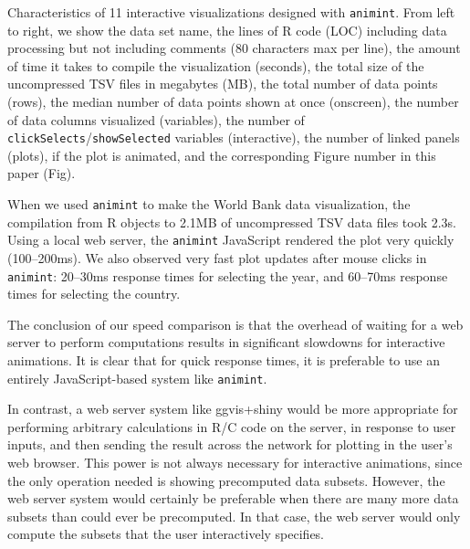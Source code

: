 \documentclass[journal]{vgtc}\usepackage[]{graphicx}\usepackage[]{color}
\begin{document}
\begin{table}[b!] %
  \centering
  
  \vskip 0.2cm
  \caption{Characteristics of 11 interactive visualizations designed with
    \texttt{animint}. From left to right, we show the data set name, the
    lines of R code (LOC) including data processing but not including comments
    (80 characters max per line),
    the amount of time it takes to compile the visualization (seconds),
    the total size of the uncompressed TSV files in megabytes (MB),
    the total number of data points (rows),
    the median number of data points shown at once (onscreen),
    the number of data columns visualized (variables),
    the number of \texttt{clickSelects}/\texttt{showSelected} variables (interactive),
    the number of linked panels (plots),
    if the plot is animated,
    and the corresponding Figure number in this paper (Fig).
  }
\label{tab:examples}
\end{table}

When we used \texttt{animint} to make the World Bank data visualization, the
compilation from R objects to 2.1MB of uncompressed TSV data files
took 2.3s. Using a local web server, the \texttt{animint} JavaScript rendered
the plot very quickly (100--200ms). We also observed very fast plot
updates after mouse clicks in \texttt{animint}: 20--30ms response times for
selecting the year, and 60--70ms response times for selecting the
country.

The conclusion of our speed comparison is that the overhead of waiting
for a web server to perform computations results in significant
slowdowns for interactive animations. It is clear that for quick
response times, it is preferable to use an entirely JavaScript-based
system like \texttt{animint}.

In contrast, a web server system like ggvis+shiny would be more
appropriate for
performing arbitrary calculations in R/C code on the server, in
response to user inputs, and then sending the result across the
network for plotting in the user's web browser. This power is not
always necessary for interactive animations, since the only operation
needed is showing precomputed data subsets. However, the web server
system would certainly be preferable when there are many more data
subsets than could ever be precomputed. In that case, the web server
would only compute the subsets that the user interactively specifies.
\end{document}
